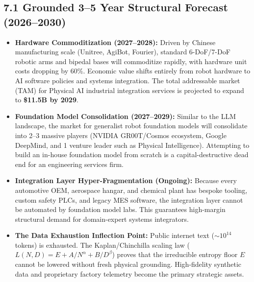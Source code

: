 \documentclass[11pt,a4paper]{article}
\begin{document}
\subsection{7.1 Grounded 3--5 Year Structural Forecast (2026--2030)}
\begin{itemize}
    \item \textbf{Hardware Commoditization (2027--2028):} Driven by Chinese manufacturing scale (Unitree, AgiBot, Fourier), standard 6-DoF/7-DoF robotic arms and bipedal bases will commoditize rapidly, with hardware unit costs dropping by 60\%. Economic value shifts entirely from robot hardware to AI software policies and systems integration. The total addressable market (TAM) for Physical AI industrial integration services is projected to expand to \textbf{\$11.5B by 2029}.
    \item \textbf{Foundation Model Consolidation (2027--2029):} Similar to the LLM landscape, the market for generalist robot foundation models will consolidate into 2--3 massive players (NVIDIA GR00T/Cosmos ecosystem, Google DeepMind, and 1 venture leader such as Physical Intelligence). Attempting to build an in-house foundation model from scratch is a capital-destructive dead end for an engineering services firm.
    \item \textbf{Integration Layer Hyper-Fragmentation (Ongoing):} Because every automotive OEM, aerospace hangar, and chemical plant has bespoke tooling, custom safety PLCs, and legacy MES software, the integration layer cannot be automated by foundation model labs. This guarantees high-margin structural demand for domain-expert systems integrators.
    \item \textbf{The Data Exhaustion Inflection Point:} Public internet text ($\sim 10^{14}$ tokens) is exhausted. The Kaplan/Chinchilla scaling law ($L(N,D) = E + A/N^\alpha + B/D^\beta$) proves that the irreducible entropy floor $E$ cannot be lowered without fresh physical grounding. High-fidelity synthetic data and proprietary factory telemetry become the primary strategic assets.
\end{itemize}
\end{document}
